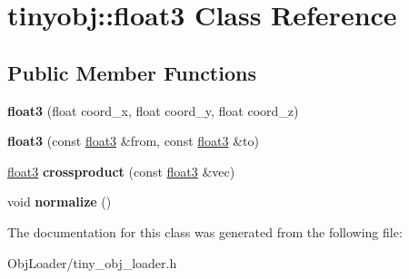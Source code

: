 \hypertarget{classtinyobj_1_1float3}{}\section{tinyobj\+:\+:float3 Class Reference}
\label{classtinyobj_1_1float3}
\subsection*{Public Member Functions}
\begin{DoxyCompactItemize}
\item 
\mbox{\label{classtinyobj_1_1float3_a604959087fc070b5dd49b868622abaf1}} 
{\bfseries float3} (float coord\+\_\+x, float coord\+\_\+y, float coord\+\_\+z)
\item 
\mbox{\label{classtinyobj_1_1float3_aeaa3aecb9eddaf31bb8c45ec6fc1dcfd}} 
{\bfseries float3} (const \hyperlink{classtinyobj_1_1float3}{float3} \&from, const \hyperlink{classtinyobj_1_1float3}{float3} \&to)
\item 
\mbox{\label{classtinyobj_1_1float3_a80417e47c5b7933f88398441e8159d7a}} 
\hyperlink{classtinyobj_1_1float3}{float3} {\bfseries crossproduct} (const \hyperlink{classtinyobj_1_1float3}{float3} \&vec)
\item 
\mbox{\label{classtinyobj_1_1float3_a229b875200ce230ceb4914c52a4cd778}} 
void {\bfseries normalize} ()
\end{DoxyCompactItemize}


The documentation for this class was generated from the following file\+:\begin{DoxyCompactItemize}
\item 
Obj\+Loader/tiny\+\_\+obj\+\_\+loader.\+h\end{DoxyCompactItemize}
